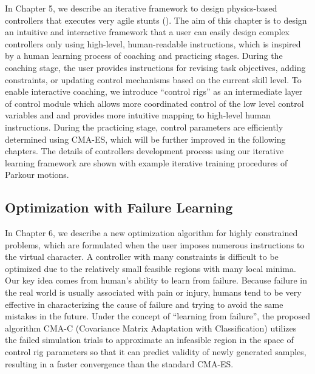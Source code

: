In Chapter 5, we describe an iterative framework to design physics-based
controllers that executes very agile stunts ().
The aim of this chapter is to design an intuitive and interactive framework
that a user can easily design complex controllers only using high-level,
human-readable instructions, 
which is inspired by a human learning process of coaching and practicing stages.
During the coaching stage, the user provides instructions for revising
task objectives, adding constraints, or updating control mechanisms based
on the current skill level.
To enable interactive coaching, we introduce ``control rigs'' as
an intermediate layer of control module which allows more coordinated control
of the low level control variables and and provides more intuitive mapping to
high-level human instructions. 
During the practicing stage, control parameters are efficiently determined
using CMA-ES, which will be further improved in the following chapters.
The details of controllers development process using our iterative learning
framework are shown with example iterative training procedures of Parkour
motions.

\subsection{Optimization with Failure Learning}
In Chapter 6, we describe a new optimization algorithm for
highly constrained problems, which are formulated when the user
imposes numerous instructions to the virtual character.
A controller with many constraints is difficult to be optimized due to the
relatively small feasible regions with many local minima.
Our key idea comes from human’s ability to learn from failure. 
Because failure in the real world is usually associated with pain or injury,
humans tend to be very effective in characterizing the cause of failure and
trying to avoid the same mistakes in the future. 
Under the concept of ``learning from failure'', the proposed algorithm CMA-C
(Covariance Matrix Adaptation with Classification) utilizes the failed
simulation trials to approximate an infeasible region in the space of control
rig parameters so that it can predict validity of newly generated samples,
resulting in a faster convergence than the standard CMA-ES.

